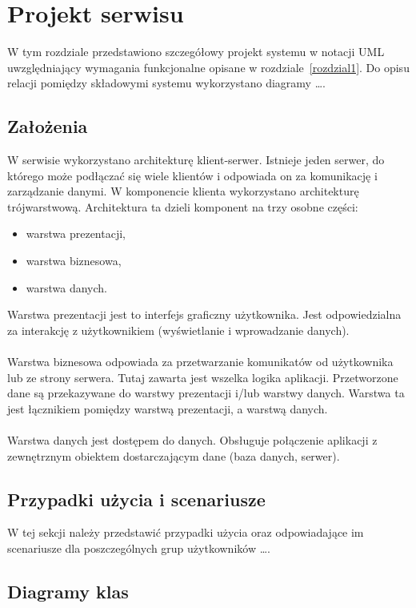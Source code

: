 \chapter{Projekt serwisu}
\thispagestyle{chapterBeginStyle}

W tym rozdziale przedstawiono szczegółowy projekt systemu w notacji UML uwzględniający wymagania funkcjonalne opisane w rozdziale~\ref{rozdzial1}. Do opisu relacji pomiędzy składowymi systemu wykorzystano diagramy \ldots.

\section{Założenia}

W serwisie wykorzystano architekturę klient-serwer. Istnieje jeden serwer, do którego może podłączać się wiele klientów i odpowiada on za komunikację i zarządzanie danymi.
W komponencie klienta wykorzystano architekturę trójwarstwową. Architektura ta dzieli komponent na trzy osobne części:
\begin{itemize}
	\item warstwa prezentacji,
	\item warstwa biznesowa,
	\item warstwa danych.
\end{itemize}
Warstwa prezentacji jest to interfejs graficzny użytkownika. Jest odpowiedzialna za interakcję z użytkownikiem (wyświetlanie i wprowadzanie danych). \\ \\
Warstwa biznesowa odpowiada za przetwarzanie komunikatów od użytkownika lub ze strony serwera. Tutaj zawarta jest wszelka logika aplikacji. Przetworzone dane są przekazywane do warstwy prezentacji i/lub warstwy danych. Warstwa ta jest łącznikiem pomiędzy warstwą prezentacji, a warstwą danych. \\ \\
Warstwa danych jest dostępem do danych. Obsługuje połączenie aplikacji z zewnętrznym obiektem dostarczającym dane (baza danych, serwer).

\section{Przypadki użycia i scenariusze}

W tej sekcji należy przedstawić przypadki użycia oraz odpowiadające im scenariusze dla poszczególnych grup użytkowników \ldots.

\section{Diagramy klas}

